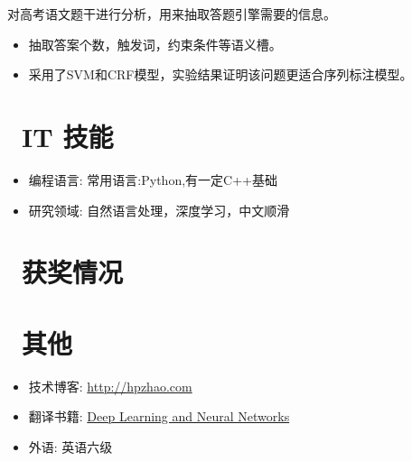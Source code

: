 \documentclass{resume}
\begin{document}
\begin{onehalfspacing}
	对高考语文题干进行分析，用来抽取答题引擎需要的信息。
	\begin{itemize}
		\item 抽取答案个数，触发词，约束条件等语义槽。
		\item 采用了SVM和CRF模型，实验结果证明该问题更适合序列标注模型。
	\end{itemize} 
\end{onehalfspacing}

\section{\faCogs\ IT 技能}
\begin{itemize}[parsep=0.5ex]
  \item 编程语言: 常用语言:Python,有一定C++基础
  \item 研究领域: 自然语言处理，深度学习，中文顺滑
  
\end{itemize}

\section{\faHeartO\ 获奖情况}

\section{\faInfo\ 其他}
\begin{itemize}[parsep=0.5ex]
  \item 技术博客: \href{http://hpzhao.com}{http://hpzhao.com}
  \item 翻译书籍: \href{http://hpzhao.com/2016/07/10/%E3%80%90%E8%AF%91%E3%80%91%E7%A5%9E%E7%BB%8F%E7%BD%91%E7%BB%9C%E4%B8%8E%E6%B7%B1%E5%BA%A6%E5%AD%A6%E4%B9%A0/}{Deep Learning and Neural Networks}
  \item 外语: 英语六级
\end{itemize}
\end{document}
